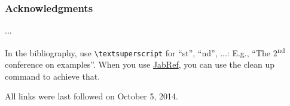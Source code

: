 \documentclass[runningheads,a4paper]{llncs}[2015/06/24]
\begin{document}
\subsubsection*{Acknowledgments}
...

In the bibliography, use \texttt{\textbackslash textsuperscript} for ``st'', ``nd'', ...:
E.g., \enquote{The 2\textsuperscript{nd} conference on examples}.
When you use \href{https://www.jabref.org}{JabRef}, you can use the clean up command to achieve that.




All links were last followed on October 5, 2014.
\end{document}
